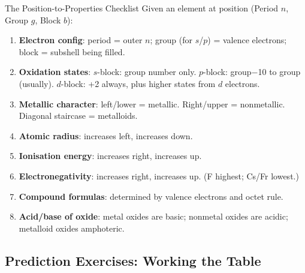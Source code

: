 \documentclass[12pt, a4paper]{book}
\begin{document}
\begin{namedconcept}{The Position-to-Properties Checklist}
Given an element at position (Period $n$, Group $g$, Block $b$):

\begin{enumerate}[nosep, leftmargin=2em]
  \item \textbf{Electron config}: period = outer $n$;
        group (for $s$/$p$) = valence electrons;
        block = subshell being filled.
  \item \textbf{Oxidation states}: $s$-block: group number only.
        $p$-block: group$-$10 to group (usually).
        $d$-block: +2 always, plus higher states from $d$ electrons.
  \item \textbf{Metallic character}: left/lower = metallic.
        Right/upper = nonmetallic.
        Diagonal staircase = metalloids.
  \item \textbf{Atomic radius}: increases left, increases down.
  \item \textbf{Ionisation energy}: increases right, increases up.
  \item \textbf{Electronegativity}: increases right, increases up.
        (F highest; Cs/Fr lowest.)
  \item \textbf{Compound formulas}: determined by valence
        electrons and octet rule.
  \item \textbf{Acid/base of oxide}: metal oxides are basic;
        nonmetal oxides are acidic; metalloid oxides amphoteric.
\end{enumerate}
\end{namedconcept}

\subsection{Prediction Exercises: Working the Table}
\end{document}
